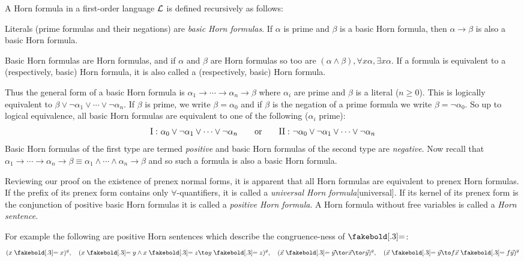 \bdefn

    A {\emphcolor Horn formula} in a first-order language ${\cal L}$ is defined recursively as follows:
    \benum
        \item Literals (prime formulas and their negations) are {\it basic Horn formulas}.
        If $\alpha$ is prime and $\beta$ is a basic Horn formula, then $\alpha\to\beta$ is also a basic Horn formula.
        \item Basic Horn formulas are Horn formulas, and if $\alpha$ and $\beta$ are Horn formulas so too are $(\alpha\land\beta),\forall x\alpha,\exists x\alpha$.
    \eenum
    If a formula is equivalent to a (respectively, basic) Horn formula, it is also called a (respectively, basic) Horn formula.

\edefn

Thus the general form of a basic Horn formula is $\alpha_1\to\cdots\to\alpha_n\to\beta$ where $\alpha_i$ are prime and $\beta$ is a literal ($n\geq0$).
This is logically equivalent to $\beta\lor\neg\alpha_1\lor\cdots\lor\neg\alpha_n$.
If $\beta$ is prime, we write $\beta=\alpha_0$ and if $\beta$ is the negation of a prime formula we write $\beta=\neg\alpha_0$.
So up to logical equivalence, all basic Horn formulas are equivalent to one of the following ($\alpha_i$ prime):
$$ {\rm I:}\ \alpha_0\lor\neg\alpha_1\lor\cdots\lor\neg\alpha_n\qquad\hbox{or}\qquad{\rm II:}\ \neg\alpha_0\lor\neg\alpha_1\lor\cdots\lor\neg\alpha_n $$
Basic Horn formulas of the first type are termed {\it positive} and basic Horn formulas of the second type are {\it negative}.
Now recall that $\alpha_1\to\cdots\to\alpha_n\to\beta\equiv\alpha_1\land\cdots\land\alpha_n\to\beta$ and so such a formula is also a basic Horn formula.

Reviewing our proof on the existence of prenex normal forms, it is apparent that all Horn formulas are equivalent to prenex Horn formulas.
If the prefix of its prenex form contains only $\forall$-quantifiers, it is called a {\it universal Horn formula}[universal].
If its kernel of its prenex form is the conjunction of positive basic Horn formulas it is called a {\it positive Horn formula}.
A Horn formula without free variables is called a {\it Horn sentence}.

For example the following are positive Horn sentences which describe the congruence-ness of $\eq$:
$$ (x\eq x)^g,\quad (x\eq y\land x\eq z\to y\eq z)^g,\quad (\vec x\eq\vec y\to r\vec x\to r\vec y)^g,\quad (\vec x\eq\vec y\to f\vec x\eq f\vec y)^g $$

